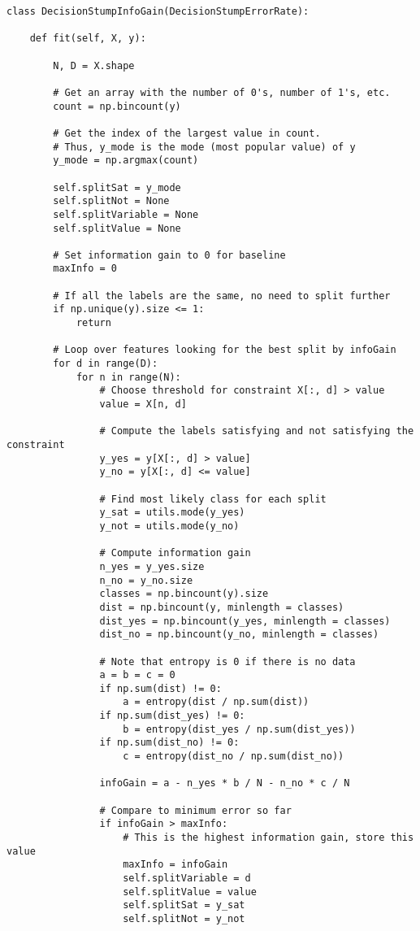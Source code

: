 \documentclass{article}
\begin{document}
\begin{Verbatim}
class DecisionStumpInfoGain(DecisionStumpErrorRate):

	def fit(self, X, y):
	
		N, D = X.shape
		
		# Get an array with the number of 0's, number of 1's, etc.
		count = np.bincount(y)    
		
		# Get the index of the largest value in count.  
		# Thus, y_mode is the mode (most popular value) of y
		y_mode = np.argmax(count) 
		
		self.splitSat = y_mode
		self.splitNot = None
		self.splitVariable = None
		self.splitValue = None
		
		# Set information gain to 0 for baseline
		maxInfo = 0
		
		# If all the labels are the same, no need to split further
		if np.unique(y).size <= 1:
			return
		
		# Loop over features looking for the best split by infoGain
		for d in range(D):
			for n in range(N):
				# Choose threshold for constraint X[:, d] > value
				value = X[n, d]
				
				# Compute the labels satisfying and not satisfying the constraint
				y_yes = y[X[:, d] > value]
				y_no = y[X[:, d] <= value]
				
				# Find most likely class for each split
				y_sat = utils.mode(y_yes)
				y_not = utils.mode(y_no)
				
				# Compute information gain
				n_yes = y_yes.size
				n_no = y_no.size
				classes = np.bincount(y).size
				dist = np.bincount(y, minlength = classes)
				dist_yes = np.bincount(y_yes, minlength = classes)
				dist_no = np.bincount(y_no, minlength = classes)
				
				# Note that entropy is 0 if there is no data 
				a = b = c = 0
				if np.sum(dist) != 0:
					a = entropy(dist / np.sum(dist))
				if np.sum(dist_yes) != 0:
					b = entropy(dist_yes / np.sum(dist_yes))
				if np.sum(dist_no) != 0:
					c = entropy(dist_no / np.sum(dist_no))
				
				infoGain = a - n_yes * b / N - n_no * c / N
				
				# Compare to minimum error so far
				if infoGain > maxInfo:
					# This is the highest information gain, store this value
					maxInfo = infoGain
					self.splitVariable = d
					self.splitValue = value
					self.splitSat = y_sat
					self.splitNot = y_not

\end{Verbatim}
\end{document}
